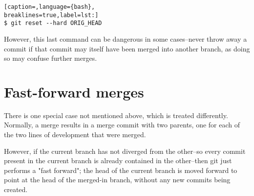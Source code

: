 \lstset{basicstyle=\scriptsize, numbers=none, captionpos=b, tabsize=4}
\begin{lstlisting}[caption=,language={bash},
breaklines=true,label=lst:]
$ git reset --hard ORIG_HEAD
\end{lstlisting}

However, this last command can be dangerous in some cases--never throw away a
commit if that commit may itself have been merged into another branch, as doing
so may confuse further merges.

\section{Fast-forward merges}

There is one special case not mentioned above, which is treated differently.
Normally, a merge results in a merge commit with two parents, one for each of
the two lines of development that were merged.

However, if the current branch has not diverged from the other--so every commit
present in the current branch is already contained in the other--then git just
performs a "fast forward"; the head of the current branch is moved forward to
point at the head of the merged-in branch, without any new commits being
created.
